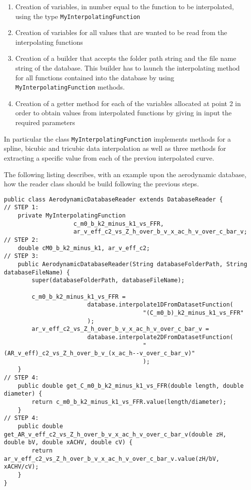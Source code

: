 \begin{enumerate}
\item Creation of variables, in number equal to the function to be interpolated, using the type \lstinline[language=Java]!MyInterpolatingFunction! 
\item Creation of variables for all values that are wanted to be read from the interpolating functions
\item Creation of a builder that accepts the folder path string and the file name string of the database. This builder has to launch the interpolating method for all functions contained into the database by using  \lstinline[language=Java]!MyInterpolatingFunction! methods.
\item Creation of a getter method for each of the variables allocated at point 2 in order to obtain values from interpolated functions by giving in input the required parameters
\end{enumerate}

In particular the class \lstinline[language=Java]!MyInterpolatingFunction! implements methods for a spline, bicubic and tricubic data interpolation as well as three methods for extracting a specific value from each of the previou interpolated curve.

\bigskip
The following listing describes, with an example upon the aerodynamic database, how the reader class should be build following the previous steps.

\lstset{language=Java}
\begin{lstlisting}[caption={DatabaseReader son class creation}, captionpos=t, tabsize=2]
public class AerodynamicDatabaseReader extends DatabaseReader {
// STEP 1:
	private MyInterpolatingFunction 
					c_m0_b_k2_minus_k1_vs_FFR,
					ar_v_eff_c2_vs_Z_h_over_b_v_x_ac_h_v_over_c_bar_v;
// STEP 2:
	double cM0_b_k2_minus_k1, ar_v_eff_c2;
// STEP 3:
	public AerodynamicDatabaseReader(String databaseFolderPath, String databaseFileName) {
		super(databaseFolderPath, databaseFileName);

		c_m0_b_k2_minus_k1_vs_FFR = 
						database.interpolate1DFromDatasetFunction(
										"(C_m0_b)_k2_minus_k1_vs_FFR"
						);
		ar_v_eff_c2_vs_Z_h_over_b_v_x_ac_h_v_over_c_bar_v =
						database.interpolate2DFromDatasetFunction(
										"(AR_v_eff)_c2_vs_Z_h_over_b_v_(x_ac_h--v_over_c_bar_v)"
										);
	}
// STEP 4:	
	public double get_C_m0_b_k2_minus_k1_vs_FFR(double length, double diameter) { 
		return c_m0_b_k2_minus_k1_vs_FFR.value(length/diameter);
	}
// STEP 4:
	public double get_AR_v_eff_c2_vs_Z_h_over_b_v_x_ac_h_v_over_c_bar_v(double zH, double bV, double xACHV, double cV) {
		return ar_v_eff_c2_vs_Z_h_over_b_v_x_ac_h_v_over_c_bar_v.value(zH/bV, xACHV/cV);
	}
}
\end{lstlisting}